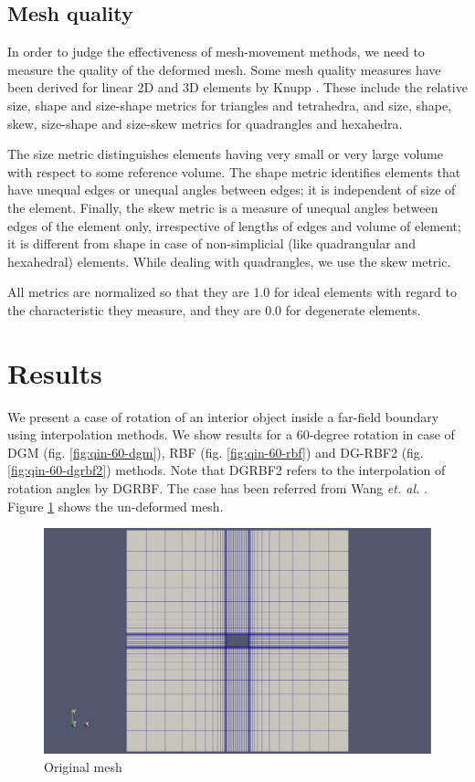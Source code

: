 \documentclass[letterpaper,11pt]{article}
\begin{document}
\subsection{Mesh quality}

In order to judge the effectiveness of mesh-movement methods, we need to measure the quality of the deformed mesh. Some mesh quality measures have been derived for linear 2D and 3D elements by Knupp \cite{qualknupp}. These include the relative size, shape and size-shape metrics for triangles and tetrahedra, and size, shape, skew, size-shape and size-skew metrics for quadrangles and hexahedra.

The size metric distinguishes elements having very small or very large volume with respect to some reference volume. The shape metric identifies elements that have unequal edges or unequal angles between edges; it is independent of size of the element. Finally, the skew metric is a measure of unequal angles between edges of the element only, irrespective of lengths of edges and volume of element; it is different from shape in case of non-simplicial (like quadrangular and hexahedral) elements. While dealing with quadrangles, we use the skew metric.

All metrics are normalized so that they are 1.0 for ideal elements with regard to the characteristic they measure, and they are 0.0 for degenerate elements. 

\section{Results}
We present a case of rotation of an interior object inside a far-field boundary using interpolation methods. We show results for a 60-degree rotation in case of DGM (fig. \ref{fig:qin-60-dgm}), RBF (fig. \ref{fig:qin-60-rbf}) and DG-RBF2 (fig. \ref{fig:qin-60-dgrbf2}) methods. Note that DGRBF2 refers to the interpolation of rotation angles by DGRBF. The case has been referred from Wang \emph{et. al.} \cite{mm:dgrbf}. Figure \ref{fig:qin-orig} shows the un-deformed mesh.

\begin{figure}
	\centering
	\includegraphics[scale=0.25]{qin-orig-mesh.pdf}
	\caption{Original mesh}
	\label{fig:qin-orig}
\end{figure}
\end{document}
